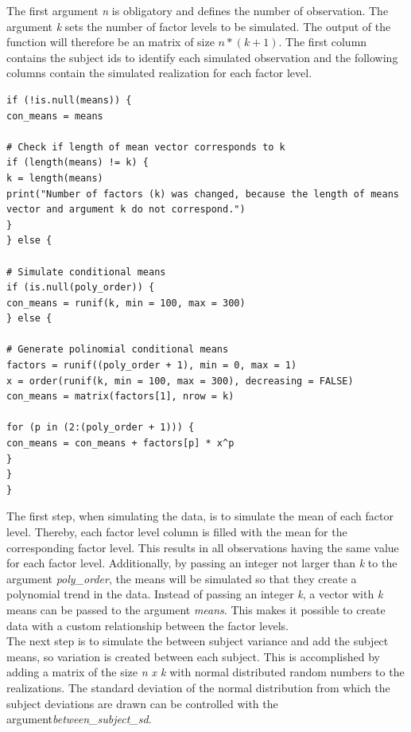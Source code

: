 \documentclass[11pt]{article}
\begin{document}
				 The first argument \textit{n} is obligatory and defines the number of observation. The argument \textit{k} sets the number of factor levels to be simulated. The output of the function will therefore be an matrix of size $n * (k + 1)$. The first column contains the subject ids to identify each simulated observation and the following columns contain the simulated realization for each factor level.\\
				 
				\begin{lstlisting}
if (!is.null(means)) {
con_means = means
					    
# Check if length of mean vector corresponds to k
if (length(means) != k) {
k = length(means)
print("Number of factors (k) was changed, because the length of means vector and argument k do not correspond.")
}
} else {
			    
# Simulate conditional means
if (is.null(poly_order)) {
con_means = runif(k, min = 100, max = 300)
} else {
					    
# Generate polinomial conditional means
factors = runif((poly_order + 1), min = 0, max = 1)
x = order(runif(k, min = 100, max = 300), decreasing = FALSE)
con_means = matrix(factors[1], nrow = k)
			    
for (p in (2:(poly_order + 1))) {
con_means = con_means + factors[p] * x^p
}
}
}
				\end{lstlisting}
				 
				 The first step, when simulating the data, is to simulate the mean of each factor level. Thereby, each factor level column is filled with the mean for the corresponding factor level. This results in all observations having the same value for each factor level. Additionally, by passing an integer not larger than \textit{k} to the argument \textit{poly\_order}, the means will be simulated so that they create a polynomial trend in the data. Instead of passing an integer \textit{k}, a vector with \textit{k} means can be passed to the argument \textit{means}. This makes it possible to create data with a custom relationship between the factor levels.\\
				 
				 The next step is to simulate the between subject variance and add the subject means, so variation is created between each subject. This is accomplished by adding a matrix of the size \textit{n x k} with normal distributed random numbers to the realizations. The standard deviation of the normal distribution from which the subject deviations are drawn can be controlled with the argument\textit{between\_subject\_sd}. \\
				 
\end{document}

